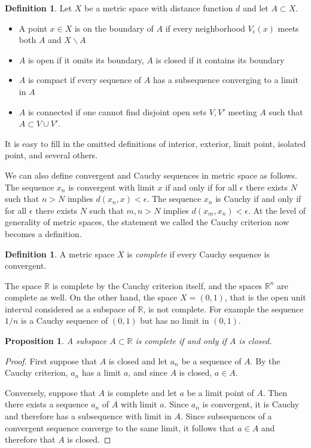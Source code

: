 \documentclass[11pt,oneside]{amsbook}
\newcommand{\RR}{\mathbb R}
\renewcommand{\setminus}{\smallsetminus}
\theoremstyle{definition}
\theoremstyle{plain}
\newtheorem{prop}[thm]{Proposition}
\theoremstyle{definition}
\newtheorem{defn}[thm]{Definition}
\theoremstyle{remark}
\numberwithin{equation}{section}
\numberwithin{figure}{section}
\begin{document}
\begin{defn}
  Let $X$ be a metric space with distance function $d$ and let $A\subset X$.
  \begin{itemize}
  \item A point $x\in X$ is on the boundary of $A$ if every neighborhood $V_\epsilon(x)$ meets both $A$ and $X\setminus A$
  \item $A$ is open if it omits its boundary, $A$ is closed if it contains its boundary
  \item $A$ is compact if every sequence of $A$ has a subsequence converging to a limit in $A$
  \item $A$ is connected if one cannot find disjoint open sets $V,V'$ meeting $A$ such that $A\subset V\cup V'$.
  \end{itemize}
\end{defn}

It is easy to fill in the omitted definitions of interior, exterior, limit point, isolated point, and several others.

We can also define convergent and Cauchy sequences in metric space as follows. The sequence $x_n$ is convergent with limit $x$ if and only if for all $\epsilon$ there exists $N$ such that $n>N$ implies $d(x_n,x)<\epsilon$. The sequence $x_n$ is Cauchy if and only if for all $\epsilon$ there exists $N$ such that $m,n>N$ implies $d(x_m,x_n)<\epsilon$. At the level of generality of metric spaces, the statement we called the Cauchy criterion now becomes a definition.

\begin{defn}
  A metric space $X$ is \emph{complete} if every Cauchy sequence is convergent.
\end{defn}

The space $\RR$ is complete by the Cauchy criterion itself, and the spaces $\RR^n$ are complete as well. On the other hand, the space $X=(0,1)$, that is the open unit interval considered as a subspace of $\RR$, is not complete. For example the sequence $1/n$ is a Cauchy sequence of $(0,1)$ but has no limit in $(0,1)$.

\begin{prop}
  A subspace $A\subset\RR$ is complete if and only if $A$ is closed.
\end{prop}

\begin{proof}
  First suppose that $A$ is closed and let $a_n$ be a sequence of $A$. By the Cauchy criterion, $a_n$ has a limit $a$, and since $A$ is closed, $a\in A$. 

  Conversely, suppose that $A$ is complete and let $a$ be a limit point of $A$. Then there exists a sequence $a_n$ of $A$ with limit $a$. Since $a_n$ is convergent, it is Cauchy and therefore has a subsequence with limit in $A$. Since subsequences of a convergent sequence converge to the same limit, it follows that $a\in A$ and therefore that $A$ is closed.
\end{proof}
\end{document}
